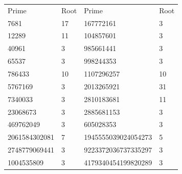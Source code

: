 \begin{tabular}{ l l l l }
    Prime & Root & Prime & Root \\
    7681  &   17 & 167772161 & 3 \\
    12289 & 11 & 104857601 & 3 \\
    40961 & 3 & 985661441 & 3 \\
    65537 & 3 & 998244353 & 3 \\   
    786433 & 10 & 1107296257 & 10 \\
    5767169 & 3 & 2013265921 & 31 \\
    7340033 & 3 & 2810183681 & 11 \\
    23068673 & 3 & 2885681153 & 3 \\
    469762049 & 3 & 605028353 & 3 \\
    2061584302081 & 7 & 1945555039024054273 & 5 \\
    2748779069441 & 3 & 9223372036737335297 & 3 \\
    1004535809 & 3 & 4179340454199820289 & 3
\end{tabular}